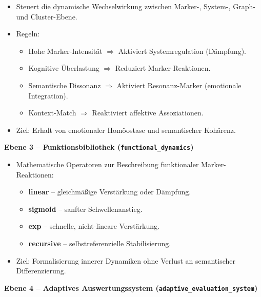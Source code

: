 \begin{itemize}
    \item Steuert die dynamische Wechselwirkung zwischen Marker-, System-, Graph- und Cluster-Ebene.
    \item Regeln:
    \begin{itemize}
        \item Hohe Marker-Intensität $\Rightarrow$ Aktiviert Systemregulation (Dämpfung).
        \item Kognitive Überlastung $\Rightarrow$ Reduziert Marker-Reaktionen.
        \item Semantische Dissonanz $\Rightarrow$ Aktiviert Resonanz-Marker (emotionale Integration).
        \item Kontext-Match $\Rightarrow$ Reaktiviert affektive Assoziationen.
    \end{itemize}
    \item Ziel: Erhalt von emotionaler Homöostase und semantischer Kohärenz.
\end{itemize}

\vspace{1em}
\textbf{Ebene 3 – Funktionsbibliothek (\texttt{functional\_dynamics})}

\begin{itemize}
    \item Mathematische Operatoren zur Beschreibung funktionaler Marker-Reaktionen:
    \begin{itemize}
        \item \textbf{linear} – gleichmäßige Verstärkung oder Dämpfung.
        \item \textbf{sigmoid} – sanfter Schwellenanstieg.
        \item \textbf{exp} – schnelle, nicht-lineare Verstärkung.
        \item \textbf{recursive} – selbstreferenzielle Stabilisierung.
    \end{itemize}
    \item Ziel: Formalisierung innerer Dynamiken ohne Verlust an semantischer Differenzierung.
\end{itemize}

\vspace{1em}
\textbf{Ebene 4 – Adaptives Auswertungssystem (\texttt{adaptive\_evaluation\_system})}

